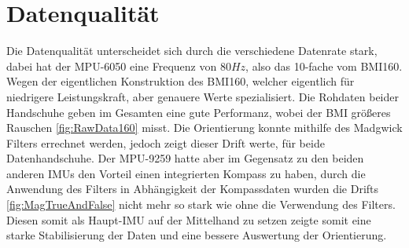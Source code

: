 \section{Datenqualität}
Die Datenqualität unterscheidet sich durch die verschiedene Datenrate stark, dabei hat der MPU-6050 eine Frequenz von $80 Hz$, also das 10-fache vom BMI160.
Wegen der eigentlichen Konstruktion des BMI160, welcher eigentlich für 
niedrigere Leistungskraft, aber genauere Werte spezialisiert. 
Die Rohdaten beider Handschuhe geben im Gesamten eine gute Performanz, wobei der BMI größeres Rauschen \ref{fig:RawData160} misst. 
Die Orientierung konnte mithilfe des Madgwick Filters errechnet werden, jedoch zeigt dieser Drift werte, für beide Datenhandschuhe. 
Der MPU-9259 hatte aber im Gegensatz zu den beiden anderen IMUs den Vorteil einen integrierten Kompass zu haben, durch die Anwendung des Filters in Abhängigkeit der Kompassdaten wurden die Drifts \ref{fig:MagTrueAndFalse} nicht mehr so stark wie ohne die Verwendung des Filters. Diesen somit als Haupt-IMU auf der Mittelhand zu setzen zeigte somit eine starke Stabilisierung der Daten und eine bessere Auswertung der Orientierung.